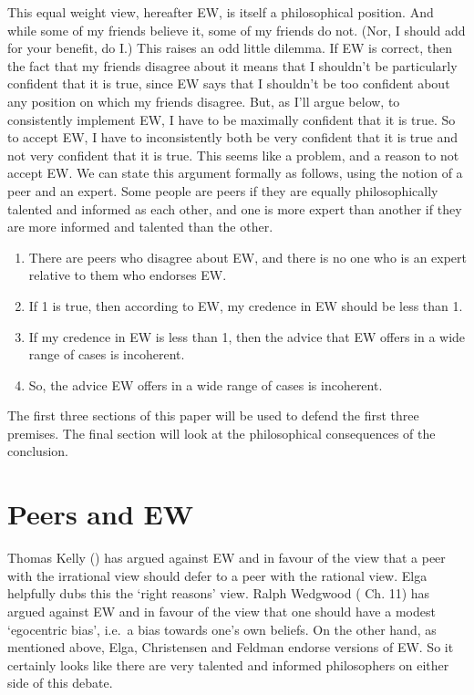 \documentclass[
  11pt,
  letterpaper,
  DIV=11,
  numbers=noendperiod,
  oneside]{scrartcl}
\providecommand{\tightlist}{%
  \setlength{\itemsep}{0pt}\setlength{\parskip}{0pt}}\usepackage{longtable,booktabs,array}
\begin{document}
This equal weight view, hereafter EW, is itself a philosophical
position. And while some of my friends believe it, some of my friends do
not. (Nor, I should add for your benefit, do I.) This raises an odd
little dilemma. If EW is correct, then the fact that my friends disagree
about it means that I shouldn't be particularly confident that it is
true, since EW says that I shouldn't be too confident about any position
on which my friends disagree. But, as I'll argue below, to consistently
implement EW, I have to be maximally confident that it is true. So to
accept EW, I have to inconsistently both be very confident that it is
true and not very confident that it is true. This seems like a problem,
and a reason to not accept EW. We can state this argument formally as
follows, using the notion of a peer and an expert. Some people are peers
if they are equally philosophically talented and informed as each other,
and one is more expert than another if they are more informed and
talented than the other.

\begin{enumerate}
\def\labelenumi{\arabic{enumi}.}
\tightlist
\item
  There are peers who disagree about EW, and there is no one who is an
  expert relative to them who endorses EW.
\item
  If 1 is true, then according to EW, my credence in EW should be less
  than 1.
\item
  If my credence in EW is less than 1, then the advice that EW offers in
  a wide range of cases is incoherent.
\item
  So, the advice EW offers in a wide range of cases is incoherent.
\end{enumerate}

The first three sections of this paper will be used to defend the first
three premises. The final section will look at the philosophical
consequences of the conclusion.

\section{Peers and EW}\label{peers-and-ew}

Thomas Kelly () has argued against
EW and in favour of the view that a peer with the irrational view should
defer to a peer with the rational view. Elga helpfully dubs this the
`right reasons' view. Ralph Wedgwood
( Ch. 11) has argued against EW
and in favour of the view that one should have a modest `egocentric
bias', i.e.~a bias towards one's own beliefs. On the other hand, as
mentioned above, Elga, Christensen and Feldman endorse versions of EW.
So it certainly looks like there are very talented and informed
philosophers on either side of this debate.
\end{document}
